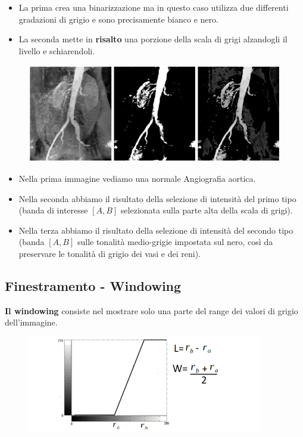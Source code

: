 \begin{itemize}
    \item La prima crea una binarizzazione ma in questo caso utilizza due
          differenti gradazioni di grigio e sono precisamente bianco e nero.
    \item La seconda mette in \textbf{risalto} una porzione della scala di grigi
          alzandogli il livello e schiarendoli.
\end{itemize}

\begin{figure}[H]
    \centering
    \includegraphics[width=\linewidth, keepaspectratio]{capitoli/immagini/imgs/angiografie_esempio_7.jpg}
\end{figure}

\begin{itemize}
    \item Nella prima immagine vediamo una normale Angiografia aortica.
    \item Nella seconda abbiamo il risultato della selezione di intensità del primo tipo (banda di
          interesse $[A, B]$ selezionata sulla parte alta della scala di grigi).
    \item Nella terza abbiamo il risultato della selezione di intensità del secondo tipo (banda
          $[A, B]$ sulle tonalità medio-grigie impostata sul nero, così da
          preservare le tonalità di grigio dei vasi e dei reni).
\end{itemize}

\subsection{Finestramento - Windowing}

\begin{definition}
    \textbf{Il windowing} consiste nel mostrare solo una parte del range dei valori di grigio dell'immagine.
\end{definition}

\begin{figure}[H]
    \centering
    \includegraphics[width=\linewidth, keepaspectratio]{capitoli/immagini/imgs/win1.png}
\end{figure}

